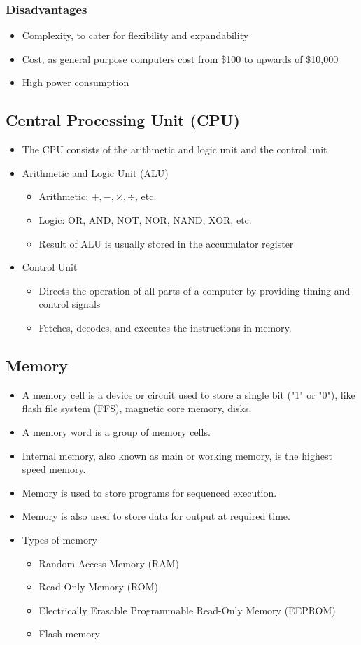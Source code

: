 \documentclass[11pt]{article}
\begin{document}
\subsubsection{Disadvantages}
\label{sec:orgd9c9885}
\begin{itemize}
\item Complexity, to cater for flexibility and expandability
\item Cost, as general purpose computers cost from \$100 to upwards of \(\$\)10,000
\item High power consumption
\end{itemize}
\subsection{Central Processing Unit (CPU)}
\label{sec:org95d83dc}
\begin{itemize}
\item The CPU consists of the arithmetic and logic unit and the control unit
\item Arithmetic and Logic Unit (ALU)
\begin{itemize}
\item Arithmetic: \(+, -, \times, \div\), etc.
\item Logic: OR, AND, NOT, NOR, NAND, XOR, etc.
\item Result of ALU is usually stored in the accumulator register
\end{itemize}
\item Control Unit
\begin{itemize}
\item Directs the operation of all parts of a computer by providing timing and control signals
\item Fetches, decodes, and executes the instructions in memory.
\end{itemize}
\end{itemize}
\subsection{Memory}
\label{sec:org3d309ac}
\begin{itemize}
\item A memory cell is a device or circuit used to store a single bit ("1" or "0"), like flash file system (FFS), magnetic core memory, disks.
\item A memory word is a group of memory cells.
\item Internal memory, also known as main or working memory, is the highest speed memory.
\item Memory is used to store programs for sequenced execution.
\item Memory is also used to store data for output at required time.
\item Types of memory
\begin{itemize}
\item Random Access Memory (RAM)
\item Read-Only Memory (ROM)
\item Electrically Erasable Programmable Read-Only Memory (EEPROM)
\item Flash memory
\end{itemize}
\end{itemize}
\end{document}
